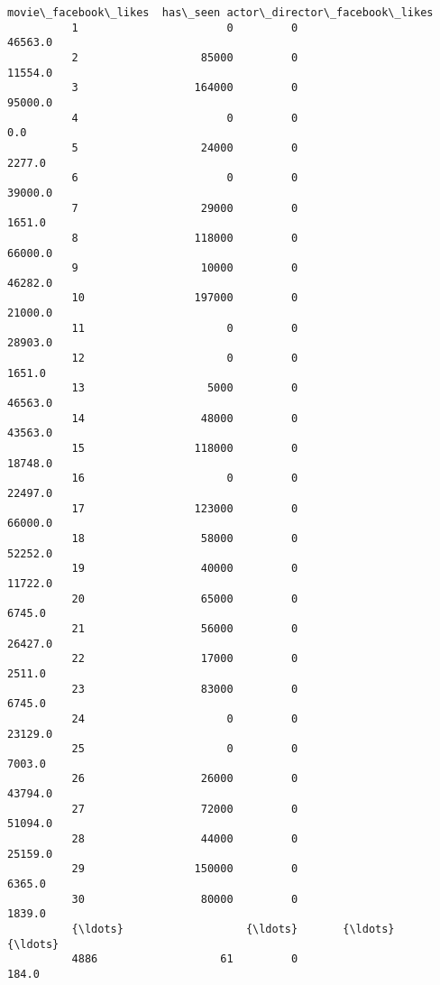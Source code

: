 \documentclass[11pt]{article}
\begin{document}
\begin{Verbatim}[commandchars=\\\{\}]
               movie\_facebook\_likes  has\_seen actor\_director\_facebook\_likes  
          1                       0         0                       46563.0  
          2                   85000         0                       11554.0  
          3                  164000         0                       95000.0  
          4                       0         0                           0.0  
          5                   24000         0                        2277.0  
          6                       0         0                       39000.0  
          7                   29000         0                        1651.0  
          8                  118000         0                       66000.0  
          9                   10000         0                       46282.0  
          10                 197000         0                       21000.0  
          11                      0         0                       28903.0  
          12                      0         0                        1651.0  
          13                   5000         0                       46563.0  
          14                  48000         0                       43563.0  
          15                 118000         0                       18748.0  
          16                      0         0                       22497.0  
          17                 123000         0                       66000.0  
          18                  58000         0                       52252.0  
          19                  40000         0                       11722.0  
          20                  65000         0                        6745.0  
          21                  56000         0                       26427.0  
          22                  17000         0                        2511.0  
          23                  83000         0                        6745.0  
          24                      0         0                       23129.0  
          25                      0         0                        7003.0  
          26                  26000         0                       43794.0  
          27                  72000         0                       51094.0  
          28                  44000         0                       25159.0  
          29                 150000         0                        6365.0  
          30                  80000         0                        1839.0  
          {\ldots}                   {\ldots}       {\ldots}                           {\ldots}  
          4886                   61         0                         184.0  

\end{Verbatim}
\end{document}
